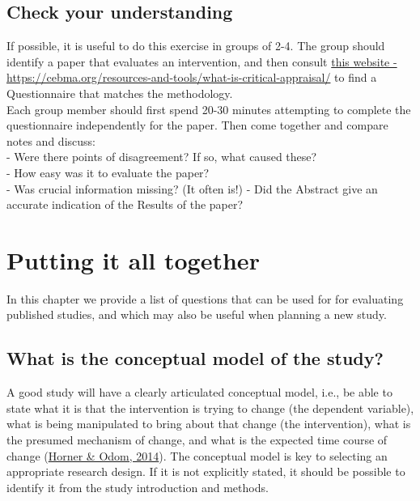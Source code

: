 \documentclass{krantz}
\begin{document}
\hypertarget{check-your-understanding-22}{%
\section{Check your understanding}\label{check-your-understanding-22}}

If possible, it is useful to do this exercise in groups of 2-4. The group should identify a paper that evaluates an intervention, and then consult \href{https://cebma.org/resources-and-tools/what-is-critical-appraisal/}{this website - https://cebma.org/resources-and-tools/what-is-critical-appraisal/} to find a Questionnaire that matches the methodology.\\
Each group member should first spend 20-30 minutes attempting to complete the questionnaire independently for the paper. Then come together and compare notes and discuss:\\
- Were there points of disagreement? If so, what caused these?\\
- How easy was it to evaluate the paper?\\
- Was crucial information missing? (It often is!) - Did the Abstract give an accurate indication of the Results of the paper?

\hypertarget{final}{%
\chapter{Putting it all together}\label{final}}

In this chapter we provide a list of questions that can be used for for evaluating published studies, and which may also be useful when planning a new study.

\hypertarget{what-is-the-conceptual-model-of-the-study}{%
\section{What is the conceptual model of the study?}\label{what-is-the-conceptual-model-of-the-study}}

A good study will have a clearly articulated conceptual model, i.e., be able to state what it is that the intervention is trying to change (the dependent variable), what is being manipulated to bring about that change (the intervention), what is the presumed mechanism of change, and what is the expected time course of change (\protect\hyperlink{ref-horner2014}{Horner \& Odom, 2014}). The conceptual model is key to selecting an appropriate research design. If it is not explicitly stated, it should be possible to identify it from the study introduction and methods. 
\end{document}
